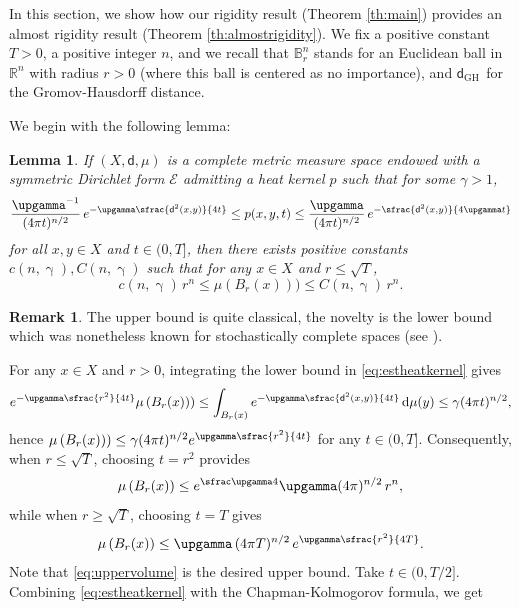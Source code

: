 \documentclass[JEP,XML,SOM,Unicode,published]{cedram}
\newcommand{\sGH}{{\scriptscriptstyle\mathrm{GH}\,}}
\theoremstyle{plain}
\newtheorem{lemma}[theorem]{Lemma}
\theoremstyle{definition}
\newtheorem{remark}[theorem]{Remark}
\newcommand{\setR}{\mathbb{R}}
\newcommand{\setB}{\mathbb{B}}
\newcommand{\cE}{\mathcal{E}}
\newcommand{\di}{\mathop{}\!\mathrm{d}}
\newcommand{\dist}{\mathsf{d}}
\begin{document}
In this section, we show how our rigidity result (Theorem \ref{th:main}) provides an almost rigidity result (Theorem \ref{th:almostrigidity}). We fix a positive constant $T>0$, a positive integer $n$, and we recall that $\setB^n_r$ stands for an Euclidean ball in $\setR^n$ with radius $r>0$ (where this ball is centered as no importance), and $\dist_{\sGH}$ for the Gromov-Hausdorff distance.

We begin with the following lemma:
\begin{lemma}\label{lem:voleu} If $(X,\dist,\mu)$ is a complete metric measure space endowed with a symmetric Dirichlet form $\cE$
admitting a heat kernel $p$ such that for some $\gamma >1$,
\begin{equation}\label{eq:estheatkernel}
\frac{\upgamma ^{-1}}{(4 \pi t)^{n/2}}\, e^{-\upgamma\sfrac{\dist^2(x,y)}{4t}}\le p(x,y,t) \le \frac{\upgamma }{(4 \pi t)^{n/2}}\, e^{-\sfrac{\dist^2(x,y)}{4\upgamma t}}
\end{equation}
for all $x, y \in X$ and $t \in (0,T]$, then there exists positive constants $c(n,\upgamma), C(n,\upgamma)$ such that for any $x\in X$ and $r\le \sqrt{T}$,
\[
c(n,\upgamma)\, r^n\le \mu(B_r(x)))\le C(n,\upgamma)\, r^n.
\]
\end{lemma}
\begin{remark} The upper bound is quite classical, the novelty is the lower bound which was nonetheless known for stochastically complete spaces (see \cite[Th.\,2.11]{Grigor'yan}).
\end{remark}
\proof For any $x \in X$ and $r>0$, integrating the lower bound in \eqref{eq:estheatkernel} gives
\[
e^{-\upgamma\sfrac{r^2}{4t}} \mu\left(B_r(x)) \right)\le \int_{B_r(x)} e^{-\upgamma\sfrac{\dist^2(x,y)}{4t}}\di\mu(y)\le \gamma (4 \pi t)^{n/2},
\]
hence $\mu\left(B_r(x)) \right)\le \gamma (4 \pi t)^{n/2} e^{\upgamma\sfrac{r^2}{4t}}$ for any $t \in (0,T]$. Consequently, when $r\le \sqrt{T}$, choosing $t=r^2$ provides
\begin{equation}\label{eq:uppervolume} \mu\left(B_r(x) \right)\le e^{\sfrac \upgamma 4} \upgamma(4 \pi)^{n/2}\, r^n,
\end{equation}
while when $r\ge \sqrt{T}$, choosing $t=T$ gives
\begin{equation}\label{eq:uppervolumeT}
\mu\left(B_r(x) \right)\le \upgamma\,(4 \pi T)^{n/2}\, e^{\upgamma\sfrac{r^2}{4T}}.
\end{equation}
Note that \eqref{eq:uppervolume} is the desired upper bound. Take $t \in (0,T/2]$. Combining \eqref{eq:estheatkernel} with the Chapman-Kolmogorov formula, we get
\end{document}
